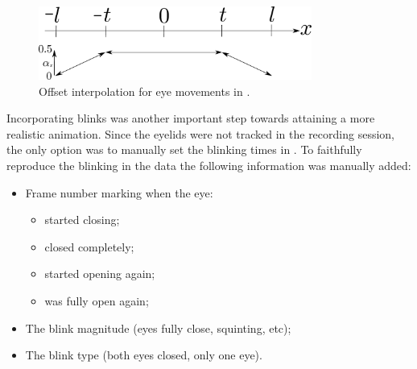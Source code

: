 \begin{figure}[htbp!]
\centering
\includegraphics[width=0.8\textwidth]{img/eyes_interpolation}
	\caption{Offset interpolation for eye movements in \Maya.}
	\label{fig:eyes_interpolation}
\end{figure}

Incorporating blinks was another important step towards attaining a more realistic animation.
Since the eyelids were not tracked in the recording session, the only option was to manually set the blinking times in \Maya.
To faithfully reproduce the blinking in the data the following information was manually added:
\begin{itemize}
\item Frame number marking when the eye:
	\begin{itemize}
	\item started closing;
	\item closed completely;
	\item started opening again;
	\item was fully open again;
	\end{itemize}
\item The blink magnitude (eyes fully close, squinting, etc);
\item The blink type (both eyes closed, only one eye).
\end{itemize}